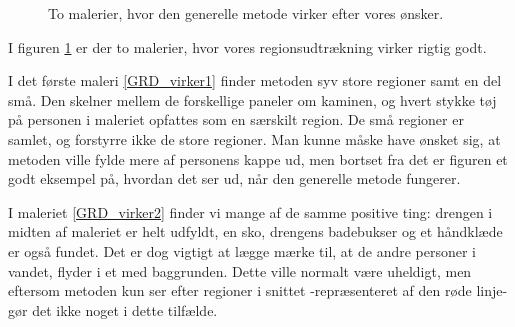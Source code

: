 \begin{figure}[!h]
{        	\label{GRD_virker1}}\hspace{1em}
		\hspace{1em}
        \caption[]{To malerier, hvor den generelle metode virker efter vores ønsker.}
     \label{generelde_region_detektor_virker}
\end{figure}

I figuren \ref{generelde_region_detektor_virker} er der to malerier, hvor
vores regionsudtrækning virker rigtig godt. 

I det første maleri \ref{GRD_virker1} finder metoden syv store regioner
samt en del små. Den skelner mellem de forskellige paneler om kaminen,
og hvert stykke tøj på personen i maleriet opfattes som en særskilt
region. De små regioner er samlet, og forstyrre ikke de store regioner.
Man kunne måske have ønsket sig, at metoden ville fylde mere af
personens kappe ud, men bortset fra det er figuren et godt eksempel på,
hvordan det ser ud, når den generelle metode fungerer.

I maleriet \ref{GRD_virker2} finder vi mange af de samme positive ting:
drengen i midten af maleriet er helt udfyldt, en sko, drengens
badebukser og et håndklæde er også fundet. Det er dog vigtigt at lægge
mærke
til, at de andre personer i vandet, flyder i et med baggrunden. Dette
ville normalt være uheldigt, men eftersom metoden kun ser efter regioner
i snittet -repræsenteret af den røde linje- gør det ikke noget i dette
tilfælde.

